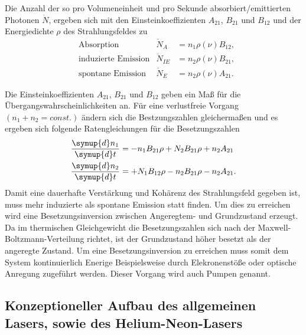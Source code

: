 Die Anzahl der so
pro Volumeneinheit und pro Sekunde
absorbiert/emittierten Photonen $\dot{N}$,
ergeben sich mit den Einsteinkoeffizienten $A_21$, $B_21$ und $B_12$
und der Energiedichte $\rho$ des Strahlungsfeldes zu
\begin{align}
& \text{Absorption}   &\dot{N}_A   &= n_1 \rho(\nu)B_{12},\\
& \text{induzierte Emission}   &\dot{N}_{IE}&= n_2 \rho(\nu)B_{21},\\
& \text{spontane Emission}   &\dot{N}_E   &= n_2 \rho(\nu) A_{21}.
\end{align}

Die Einsteinkoeffizienten $A_21$, $B_21$ und $B_12$
geben ein Maß für die Übergangswahrscheinlichkeiten an.
Für eine verlustfreie Vorgang
$(n_1+n_2=const.)$ ändern sich die Bestzungszahlen
gleichermaßen und es ergeben sich folgende
Ratengleichungen für die Besetzungszahlen
\begin{align}
\frac{\symup{d} n_1}{\symup{d} t} &=-n_1 B_{21}\rho + N_2 B_{21} \rho + n_2 A_{21}\\
\frac{\symup{d} n_2}{\symup{d} t} &=+N_1 B_{12}\rho - n_2 B_{21} \rho - n_2 A_{21}.
\end{align}
Damit eine dauerhafte Verstärkung
und Kohärenz des Strahlungsfeld gegeben ist,
muss mehr induzierte als spontane Emission
statt finden. Um dies zu
erreichen wird eine Besetzungsinversion
zwischen Angeregtem- und Grundzustand
erzeugt.
Da im thermischen Gleichgewicht
die Besetzungszahlen sich nach der
Maxwell-Boltzmann-Verteilung
richtet, ist der Grundzustand höher
besetzt als der angeregte Zustand.
Um eine Besetzungsinversion zu erreichen
muss somit dem System kontinuierlich
Enerige Beispielsweise durch
Elekronenstöße oder
optische Anregung zugeführt werden.
Dieser Vorgang wird auch Pumpen genannt.



\subsection{Konzeptioneller Aufbau des allgemeinen Lasers,
sowie des Helium-Neon-Lasers}
\label{subsec:konzeptioneller_aufbau}

